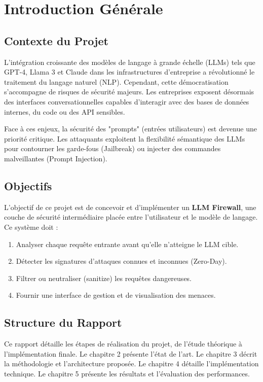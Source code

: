 \documentclass[a4paper,12pt]{report}
\begin{document}
\chapter{Introduction Générale}

\section{Contexte du Projet}
L'intégration croissante des modèles de langage à grande échelle (LLMs) tels que GPT-4, Llama 3 et Claude dans les infrastructures d'entreprise a révolutionné le traitement du langage naturel (NLP). Cependant, cette démocratisation s'accompagne de risques de sécurité majeurs. Les entreprises exposent désormais des interfaces conversationnelles capables d'interagir avec des bases de données internes, du code ou des API sensibles.

Face à ces enjeux, la sécurité des "prompts" (entrées utilisateurs) est devenue une priorité critique. Les attaquants exploitent la flexibilité sémantique des LLMs pour contourner les garde-fous (Jailbreak) ou injecter des commandes malveillantes (Prompt Injection).

\section{Objectifs}
L'objectif de ce projet est de concevoir et d'implémenter un \textbf{LLM Firewall}, une couche de sécurité intermédiaire placée entre l'utilisateur et le modèle de langage. Ce système doit :
\begin{enumerate}
    \item Analyser chaque requête entrante avant qu'elle n'atteigne le LLM cible.
    \item Détecter les signatures d'attaques connues et inconnues (Zero-Day).
    \item Filtrer ou neutraliser (sanitize) les requêtes dangereuses.
    \item Fournir une interface de gestion et de visualisation des menaces.
\end{enumerate}

\section{Structure du Rapport}
Ce rapport détaille les étapes de réalisation du projet, de l'étude théorique à l'implémentation finale.
Le chapitre 2 présente l'état de l'art.
Le chapitre 3 décrit la méthodologie et l'architecture proposée.
Le chapitre 4 détaille l'implémentation technique.
Le chapitre 5 présente les résultats et l'évaluation des performances.
\end{document}
